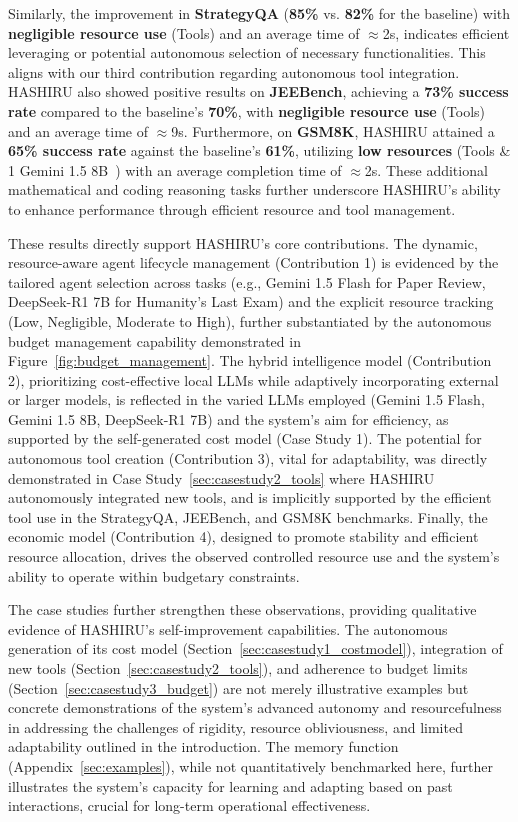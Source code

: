 \documentclass[conference]{IEEEtran}
\begin{document}
Similarly, the improvement in \textbf{StrategyQA} (\textbf{85\%} vs. \textbf{82\%} for the baseline) with \textbf{negligible resource use} (Tools) and an average time of $\approx$2s, indicates efficient leveraging or potential autonomous selection of necessary functionalities. This aligns with our third contribution regarding autonomous tool integration. HASHIRU also showed positive results on \textbf{JEEBench}, achieving a \textbf{73\% success rate} compared to the baseline's \textbf{70\%}, with \textbf{negligible resource use} (Tools) and an average time of $\approx$9s. Furthermore, on \textbf{GSM8K}, HASHIRU attained a \textbf{65\% success rate} against the baseline's \textbf{61\%}, utilizing \textbf{low resources} (Tools \& 1 Gemini 1.5 8B~\cite{gemini15flash8b}) with an average completion time of $\approx$2s. These additional mathematical and coding reasoning tasks further underscore HASHIRU's ability to enhance performance through efficient resource and tool management.

These results directly support HASHIRU's core contributions. The dynamic, resource-aware agent lifecycle management (Contribution 1) is evidenced by the tailored agent selection across tasks (e.g., Gemini 1.5 Flash for Paper Review, DeepSeek-R1 7B for Humanity's Last Exam) and the explicit resource tracking (Low, Negligible, Moderate to High), further substantiated by the autonomous budget management capability demonstrated in Figure~\ref{fig:budget_management}. The hybrid intelligence model (Contribution 2), prioritizing cost-effective local LLMs while adaptively incorporating external or larger models, is reflected in the varied LLMs employed (Gemini 1.5 Flash, Gemini 1.5 8B, DeepSeek-R1 7B) and the system's aim for efficiency, as supported by the self-generated cost model (Case Study 1). The potential for autonomous tool creation (Contribution 3), vital for adaptability, was directly demonstrated in Case Study~\ref{sec:casestudy2_tools} where HASHIRU autonomously integrated new tools, and is implicitly supported by the efficient tool use in the StrategyQA, JEEBench, and GSM8K benchmarks. Finally, the economic model (Contribution 4), designed to promote stability and efficient resource allocation, drives the observed controlled resource use and the system's ability to operate within budgetary constraints.

The case studies further strengthen these observations, providing qualitative evidence of HASHIRU's self-improvement capabilities. The autonomous generation of its cost model (Section~\ref{sec:casestudy1_costmodel}), integration of new tools (Section~\ref{sec:casestudy2_tools}), and adherence to budget limits (Section~\ref{sec:casestudy3_budget}) are not merely illustrative examples but concrete demonstrations of the system's advanced autonomy and resourcefulness in addressing the challenges of rigidity, resource obliviousness, and limited adaptability outlined in the introduction. The memory function (Appendix~\ref{sec:examples}), while not quantitatively benchmarked here, further illustrates the system's capacity for learning and adapting based on past interactions, crucial for long-term operational effectiveness.
\end{document}
